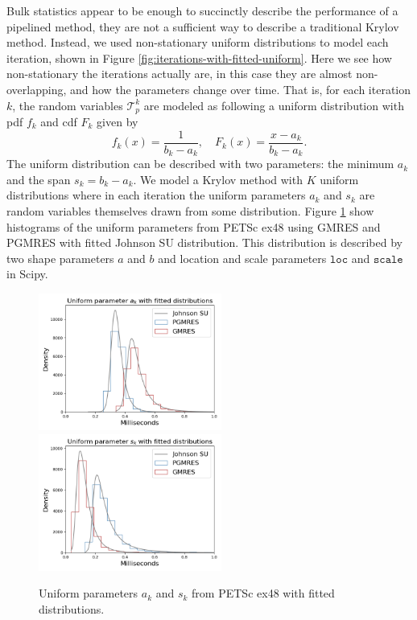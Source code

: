 \documentclass[sigconf]{acmart}
\begin{document}
Bulk statistics appear to be enough to succinctly describe the performance of a pipelined method, they are not a sufficient way to describe a traditional Krylov method. Instead, we used non-stationary uniform distributions to model each iteration, shown in Figure \ref{fig:iterations-with-fitted-uniform}.
Here we see how non-stationary the iterations actually are, in this case they are almost non-overlapping, and how the parameters change over time. 
That is, for each iteration $k$, the random variables $\mathcal{T}_p^k$ are modeled as following a uniform distribution with pdf $f_k$ and cdf $F_k$ given by
\begin{equation} \label{eq:uniform}
f_k(x) = \frac{1}{b_k - a_k}, \quad F_k(x) = \frac{x-a_k}{b_k-a_k}.
\end{equation}
The uniform distribution can be described with two parameters: the minimum $a_k$ and the span $s_k = b_k - a_k$. We model a Krylov method with $K$ uniform distributions
where in each iteration the uniform parameters $a_k$ and $s_k$ are random variables themselves drawn from some distribution. 
Figure \ref{fig:uniform-params-fitted} show histograms of the uniform parameters from  PETSc ex48 using GMRES and PGMRES with fitted Johnson SU distribution.
This distribution is described by two shape parameters $a$ and $b$ and location and scale parameters ${\texttt{loc}}$ and ${\texttt{scale}}$ in Scipy.  

\begin{figure}[t]
\centering
\includegraphics[width=6cm]{../plots/GMRES_PGMRES_ex48_8192_1000000_uniform_a_k_with_johnsonsu.png}
\includegraphics[width=6cm]{../plots/GMRES_PGMRES_ex48_8192_1000000_uniform_s_k_with_johnsonsu.png} 
\caption{Uniform parameters $a_k$ and $s_k$ from PETSc ex48 with fitted distributions.} \label{fig:uniform-params-fitted}
\end{figure}
\end{document}
